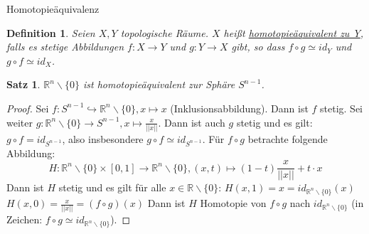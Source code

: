 \documentclass[a4paper,11pt,notitlepage]{report}
\newtheorem{definition}{Definition}[chapter]
\newtheorem{theorem}{Satz}[chapter]
\newcommand{\R}{{\ensuremath{\mathbb{R}}}}
\begin{document}
\begin{section}{Homotopieäquivalenz}
	\begin{definition}
		Seien $X,Y$ topologische Räume. $X$ heißt \underline{homotopieäquivalent zu Y}, falls es stetige Abbildungen $f \colon X \rightarrow Y$ und $g \colon Y \rightarrow X$ gibt, so dass $f \circ g \simeq id_Y$ und $g \circ f \simeq id_X$.
	\end{definition}
	
	\begin{theorem}
		$\R^n \backslash \{0\}$ ist homotopieäquivalent zur Sphäre $S^{n-1}$.
	\end{theorem}
	
	\begin{proof}
		Sei $f \colon S^{n-1} \hookrightarrow \R^n \backslash \{0\}, x \mapsto x$ (Inklusionsabbildung). Dann ist $f$ stetig.
		\newline
		Sei weiter $g \colon \R^n \backslash \{0\} \rightarrow S^{n-1}, x \mapsto \frac{x}{||x||}$. Dann ist auch $g$ stetig und es gilt:
		$g \circ f = id_{S^{n-1}}$, also insbesondere $g \circ f \simeq id_{S^{n-1}}$.
		\newline
		Für $f \circ g$ betrachte folgende Abbildung:
		$$H \colon \R^n \backslash \{0\} \times [0,1] \rightarrow \R^n \backslash \{0\}, (x,t) \mapsto (1-t) \frac{x}{||x||} + t \cdot x$$
		Dann ist $H$ stetig und es gilt für alle $x \in \R \backslash \{0\}$:
		\newline
		$H(x,1) = x = id_{\R^n \backslash \{0\}}(x)$
		\newline
		$H(x,0) = \frac{x}{||x||} = (f \circ g)(x)$
		\newline
		Dann ist $H$ Homotopie von $f \circ g$ nach $id_{\R^n \backslash \{0\}}$ (in Zeichen: $f \circ g \simeq id_{\R^n \backslash \{0\}}$).
	\end{proof}
\end{section}
\end{document}
